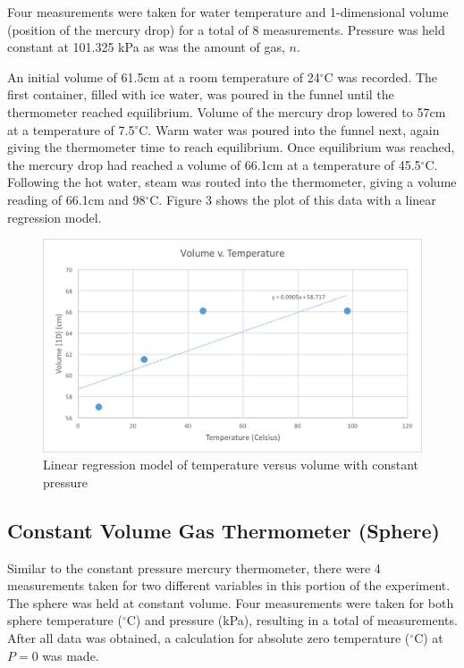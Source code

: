 \documentclass[%
 aip,
 jmp,%
 amsmath,amssymb,
 reprint,%
]{revtex4-1}
\begin{document}
  Four measurements were taken for water temperature and 1-dimensional volume (position of the mercury drop) for a total of 8 measurements. Pressure was held constant at 101.325 kPa as was the amount of gas, $n$.

  An initial volume of 61.5cm at a room temperature of 24$^{\circ}$C was recorded. The first container, filled with ice water, was poured in the funnel until the thermometer reached equilibrium. Volume of the mercury drop lowered to 57cm at a temperature of 7.5$^{\circ}$C. Warm water was poured into the funnel next, again giving the thermometer time to reach equilibrium. Once equilibrium was reached, the mercury drop had reached a volume of 66.1cm at a temperature of 45.5$^{\circ}$C. Following the hot water, steam was routed into the thermometer, giving a volume reading of 66.1cm and 98$^{\circ}$C. Figure 3 shows the plot of this data with a linear regression model.

  \begin{figure}[h]
    \centering
    \includegraphics[scale=.4]{V_vs_T.png}
    \caption{Linear regression model of temperature versus volume with constant pressure}
    \label{V_vs_T}
  \end{figure}

  \subsection{Constant Volume Gas Thermometer (Sphere)}

  Similar to the constant pressure mercury thermometer, there were 4 measurements taken for two different variables in this portion of the experiment. The sphere was held at constant volume. Four measurements were taken for both sphere temperature ($^{\circ}$C) and pressure (kPa), resulting in a total of measurements. After all data was obtained, a calculation for absolute zero temperature ($^{\circ}$C) at $P=0$ was made.
\end{document}
